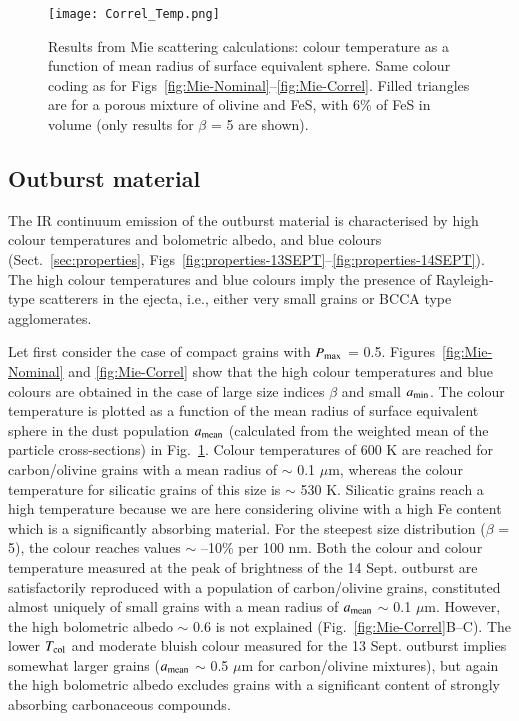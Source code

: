 \documentclass[a4paper,fleqn,usenatbib]{mnras}
\begin{document}
   \begin{figure}
    \texttt{[image: Correl\_Temp.png]}
    \caption{Results from Mie scattering calculations: colour temperature as a function of mean radius of surface equivalent sphere. Same colour coding as for Figs~\ref{fig:Mie-Nominal}--\ref{fig:Mie-Correl}. Filled triangles are for a porous mixture of olivine and FeS, with 6\% of FeS in volume (only results for $\beta$ = 5 are shown). }
    \label{fig:Mie-colT}
\end{figure}

\subsection{Outburst material}
\label{sec:outburst}
The IR continuum emission of the outburst material is characterised by high colour temperatures and bolometric albedo, and blue colours (Sect.~\ref{sec:properties}, Figs~\ref{fig:properties-13SEPT}--\ref{fig:properties-14SEPT}). The high colour temperatures and blue colours imply the presence of Rayleigh-type  scatterers in the ejecta, i.e., either very small grains or BCCA type agglomerates.

Let first consider the case of compact grains with $P_{\rm max}$ = 0.5. Figures~\ref{fig:Mie-Nominal} and \ref{fig:Mie-Correl} show that the high colour temperatures and blue colours are obtained in the case of large size indices $\beta$ and small $a_{\rm min}$. The colour temperature is plotted as a function of the mean radius of surface equivalent sphere in the dust population $a_{\rm mean}$ (calculated from the weighted mean of the particle cross-sections) in Fig.~\ref{fig:Mie-colT}. Colour temperatures of 600 K are reached  for carbon/olivine grains with a mean radius of $\sim$ 0.1 $\mu$m, whereas the colour temperature for silicatic grains of this size is $\sim$ 530 K. Silicatic grains reach a high temperature because we are here considering olivine with a high Fe content which is a significantly absorbing material. For the steepest size distribution ($\beta$ = 5), the colour reaches
values $\sim$ --10\% per 100 nm. Both the colour and colour temperature measured at the peak of brightness of the 14 Sept. outburst are satisfactorily reproduced with a  population of carbon/olivine grains, constituted almost uniquely of small grains with a mean radius of $a_{\rm mean}$ $\sim$ 0.1 $\mu$m. However, the high bolometric albedo $\sim$ 0.6 is not explained (Fig.~\ref{fig:Mie-Correl}B--C). The lower $T_{\rm col}$ and moderate bluish colour measured for the 13 Sept. outburst implies somewhat larger grains ($a_{\rm mean}$ $\sim$ 0.5 $\mu$m for carbon/olivine mixtures),
but again the high bolometric albedo excludes grains with a significant content of strongly absorbing carbonaceous compounds.
\end{document}
